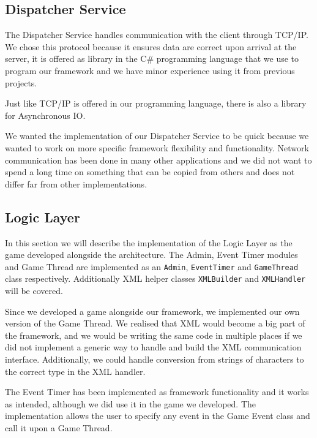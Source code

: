 \subsection{Dispatcher Service}
The Dispatcher Service handles communication with the client through TCP/IP. We chose this protocol because it ensures data are correct upon arrival at the server, it is offered as library in the C\# programming language that we use to program our framework and we have minor experience using it from previous projects. 

Just like TCP/IP is offered in our programming language, there is also a library for Asynchronous IO. 

We wanted the implementation of our Dispatcher Service to be quick because we wanted to work on more specific framework flexibility and functionality. Network communication has been done in many other applications and we did not want to spend a long time on something that can be copied from others and does not differ far from other implementations. 





\subsection{Logic Layer}
In this section we will describe the implementation of the Logic Layer as the game developed alongside the architecture. The Admin, Event Timer modules and Game Thread are implemented as an \texttt{Admin}, \texttt{EventTimer} and \texttt{GameThread} class respectively. Additionally XML helper classes \texttt{XMLBuilder} and \texttt{XMLHandler} will be covered.

Since we developed a game alongside our framework, we implemented our own version of the Game Thread. We realised that XML would become a big part of the framework, and we would be writing the same code in multiple places if we did not implement a generic way to handle and build the XML communication interface. Additionally, we could handle conversion from strings of characters to the correct type in the XML handler. 

The Event Timer has been implemented as framework functionality and it works as intended, although we did use it in the game we developed. The implementation allows the user to specify any event in the Game Event class and call it upon a Game Thread. 

